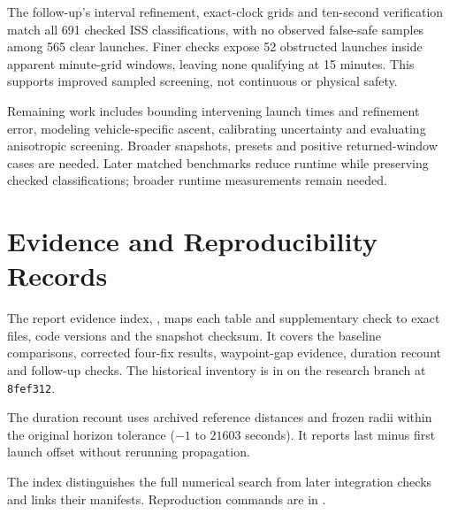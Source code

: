 \documentclass[11pt,a4paper]{article}
\begin{document}
The follow-up's interval refinement, exact-clock grids and ten-second
verification match all 691 checked ISS classifications, with no observed
false-safe samples among 565 clear launches. Finer checks expose 52
obstructed launches inside apparent minute-grid windows, leaving none
qualifying at 15 minutes. This supports improved sampled screening,
not continuous or physical safety.

Remaining work includes bounding intervening launch times and refinement
error, modeling vehicle-specific ascent, calibrating uncertainty and
evaluating anisotropic screening. Broader snapshots, presets and positive
returned-window cases are needed. Later matched benchmarks reduce runtime
while preserving checked classifications; broader runtime measurements
remain needed.

\appendix
\section{Evidence and Reproducibility Records}
\label{sec:records}

The report evidence index, , maps each table
and supplementary check to exact files, code versions and the snapshot
checksum. It covers the baseline comparisons, corrected four-fix results,
waypoint-gap evidence, duration recount and follow-up checks. The historical
inventory is in  on the research branch
at \texttt{8fef312}.

The duration recount uses archived reference distances and frozen radii
within the original horizon tolerance ($-1$ to $21603$ seconds). It reports
last minus first launch offset without rerunning propagation.

The index distinguishes the full numerical search from later integration
checks and links their manifests. Reproduction commands are in
.
\end{document}

